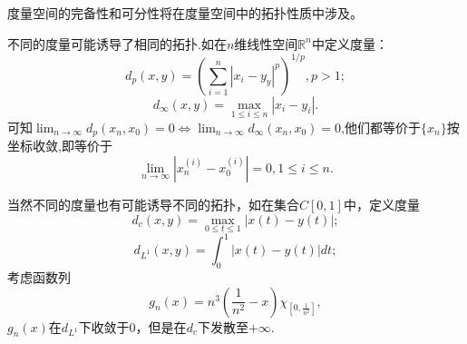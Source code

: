 \documentclass[lang=cn,10pt]{elegantbook}
\begin{document}
	度量空间的完备性和可分性将在度量空间中的拓扑性质中涉及。
	\begin{example}
		不同的度量可能诱导了相同的拓扑.如在\(n\)维线性空间\(\mathbb{R}^n\)中定义度量：
		\[d_p(x,y)=(\sum_{i=1}^{n} |x_i-y_y|^p)^{1/p},p>1;\]
		\[d_\infty(x,y)=\max_{1\le i\le n}|x_i-y_i|.\]
		可知\(\lim_{n \to \infty}d_p(x_n,x_0)=0 \Leftrightarrow \lim_{n \to \infty}d_{\infty}(x_n,x_0)=0\),他们都等价于\(\{x_n\}\)按坐标收敛,即等价于\[\lim_{n \to \infty}|x_n^{(i)}-x_0^{(i)}|=0,1\le i\le n.\]
	\end{example}
	\begin{example}
		当然不同的度量也有可能诱导不同的拓扑，如在集合\(C[0,1]\)中，定义度量
		\[d_c(x,y)=\max_{0\le t \le 1}|x(t)-y(t)|;\]
		\[d_{L^1}(x,y)=\int_{0}^{1}|x(t)-y(t)|dt;\]
		考虑函数列\[g_n(x)=n^3(\frac{1}{n^2}-x)\chi_{[0,\frac{1}{n^2}]},\]
		\(g_n(x)\)在\(d_{L^1}\)下收敛于0，但是在\(d_c\)下发散至\(+\infty\).
	\end{example}
	
\end{document}
